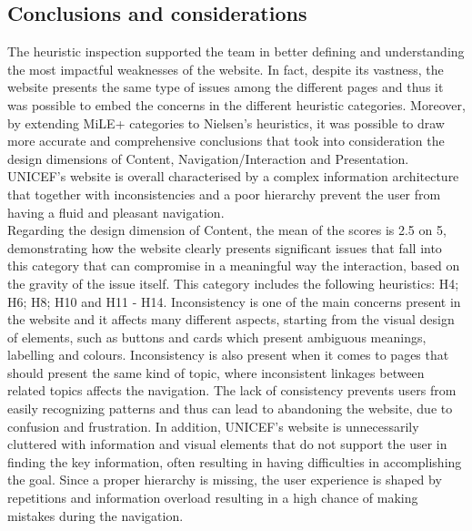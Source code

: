 
\subsection{Conclusions and considerations}

The heuristic inspection supported the team in better defining and understanding the most impactful weaknesses of the website. In fact, despite its vastness, the website presents the same type of issues among the different pages and thus it was possible to embed the concerns in the different heuristic categories. Moreover, by extending MiLE+ categories to Nielsen’s heuristics, it was possible to draw more accurate and comprehensive conclusions that took into consideration the design dimensions of Content, Navigation/Interaction and Presentation.
UNICEF’s website is overall characterised by a complex information architecture that together with inconsistencies and a poor hierarchy prevent the user from having a fluid and pleasant navigation.\\

Regarding the design dimension of Content, the mean of the scores is 2.5 on 5, demonstrating how the website clearly presents significant issues that fall into this category that can compromise in a meaningful way the interaction, based on the gravity of the issue itself. This category includes the following heuristics: H4; H6; H8; H10 and H11 - H14.
Inconsistency is one of the main concerns present in the website and it affects many different aspects, starting from the visual design of elements, such as buttons and cards which present ambiguous meanings, labelling and colours. Inconsistency is also present when it comes to pages that should present the same kind of topic, where inconsistent linkages between related topics affects the navigation. The lack of consistency prevents users from easily recognizing patterns and thus can lead to abandoning the website, due to confusion and frustration.
In addition, UNICEF's website is unnecessarily cluttered with information and visual elements that do not support the user in finding the key information, often resulting in having difficulties in accomplishing the goal. Since a proper hierarchy is missing, the user experience is shaped by repetitions and information overload resulting in a high chance of making mistakes during the navigation.\\

